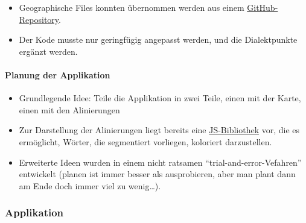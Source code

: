 \begin{itemize}
\itemsep1pt\parskip0pt
\item
  Geographische Files konnten übernommen werden aus einem
  \href{https://github.com/clemsos/d3-china-map}{GitHub-Repository}.
\item
  Der Kode musste nur geringfügig angepasst werden, und die
  Dialektpunkte ergänzt werden.
\end{itemize}



\paragraph{Planung der Applikation}

\begin{itemize}
\itemsep1pt\parskip0pt
\item
  Grundlegende Idee: Teile die Applikation in zwei Teile, einen mit der
  Karte, einen mit den Alinierungen
\item
  Zur Darstellung der Alinierungen liegt bereits eine
  \href{http://github.com/dighl/prison}{JS-Bibliothek} vor, die es
  ermöglicht, Wörter, die segmentiert vorliegen, koloriert darzustellen.
\item
  Erweiterte Ideen wurden in einem nicht ratsamen
  ``trial-and-error-Vefahren'' entwickelt (planen ist immer besser als
  ausprobieren, aber man plant dann am Ende doch immer viel zu
  wenig\ldots{}).
\end{itemize}


\subsubsection{\texorpdfstring{{Applikation}}{Applikation}}

